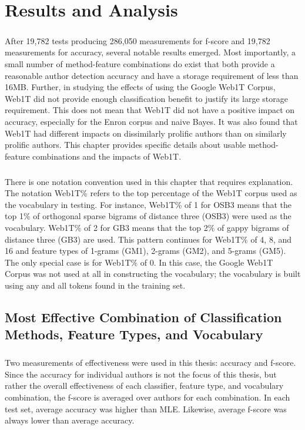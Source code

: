 \chapter{Results and Analysis}

	\paragraph*{} After 19,782 tests producing 286,050 measurements for f-score and 19,782 measurements for accuracy, several notable results emerged.  Most importantly, a small number of method-feature combinations do exist that both provide a reasonable author detection accuracy and have a storage requirement of less than 16MB.  Further, in studying the effects of using the Google Web1T Corpus, Web1T did not provide enough classification benefit to justify its large storage requirement.  This does not mean that Web1T did not have a positive impact on accuracy, especially for the Enron corpus and naive Bayes.  It was also found that Web1T had different impacts on dissimilarly prolific authors than on similarly prolific authors. This chapter provides specific details about usable method-feature combinations and the impacts of Web1T.
	\paragraph*{} There is one notation convention used in this chapter that requires explanation.  The notation Web1T\% refers to the top percentage of the Web1T corpus used as the vocabulary in testing.  For instance, Web1T\% of 1 for OSB3 means that the top 1\% of orthogonal sparse bigrams of distance three (OSB3) were used as the vocabulary.  Web1T\% of 2 for GB3 means that the top 2\% of gappy bigrams of distance three (GB3) are used.  This pattern continues for Web1T\% of 4, 8, and 16 and feature types of 1-grams (GM1), 2-grams (GM2), and 5-grams (GM5).  The only special case is for Web1T\% of 0.  In this case, the Google Web1T Corpus was not used at all in constructing the vocabulary; the vocabulary is built using any and all tokens found in the training set.

\begin{singlespace}
\section{Most Effective Combination of Classification Methods, Feature Types, and Vocabulary}
\end{singlespace}
	\paragraph*{} Two measurements of effectiveness were used in this thesis: accuracy and f-score.  Since the accuracy for individual  authors is not the focus of this thesis, but rather the overall effectiveness of each classifier, feature type, and vocabulary combination, the f-score is averaged over authors for each combination.  In each test set, average accuracy was higher than MLE.  Likewise, average f-score was always lower than average accuracy.

